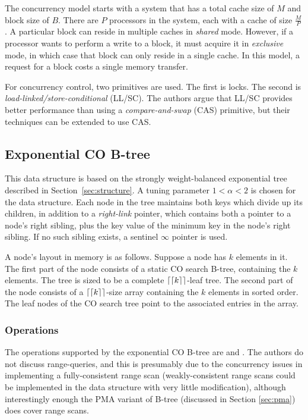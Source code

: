 \documentclass[preprint]{style}
\begin{document}
The concurrency model starts with a system that has a total cache size of $M$
and block size of $B$. There are $P$ processors in the system, each with a
cache of size $\frac{M}{P}$. A particular block can reside in multiple caches
in \textit{shared} mode. However, if a processor wants to perform a write to a
block, it must acquire it in \textit{exclusive} mode, in which case that block
can only reside in a single cache. In this model, a request for a block costs
a single memory transfer.

For concurrency control, two primitives are used. The first is locks. The
second is \textit{load-linked/store-conditional} (LL/SC). The authors argue
that LL/SC provides better performance than using a \textit{compare-and-swap}
(CAS) primitive, but their techniques can be extended to use CAS.

\subsection{Exponential CO B-tree}

This data structure is based on the strongly weight-balanced exponential tree
described in Section~\ref{sec:structure}. A tuning parameter $1 < \alpha < 2$
is chosen for the data structure. Each node in the tree maintains both keys
which divide up its children, in addition to a \textit{right-link} pointer,
which contains both a pointer to a node's right sibling, plus the key value of
the minimum key in the node's right sibling. If no such sibling exists, a
sentinel $\infty$ pointer is used.

A node's layout in memory is as follows. Suppose a node has $k$ elements in
it. The first part of the node consists of a static CO search B-tree,
containing the $k$ elements. The tree is sized to be a complete $\lceil\lceil k
\rceil\rceil$-leaf tree. The second part of the node consists of a $\lceil\lceil
k \rceil\rceil$-size array containing the $k$ elements in sorted order. The leaf
nodes of the CO search tree point to the associated entries in the array.

\subsubsection{Operations}

The operations supported by the exponential CO B-tree are \Search{} and
\Insert{}. The authors do not discuss range-queries, and this is presumably
due to the concurrency issues in implementing a fully-consistent range scan
(weakly-consistent range scans could be implemented in the data structure with
very little modification), although interestingly enough the PMA variant of
B-tree (discussed in Section \ref{sec:pma}) does cover range scans.
\end{document}
